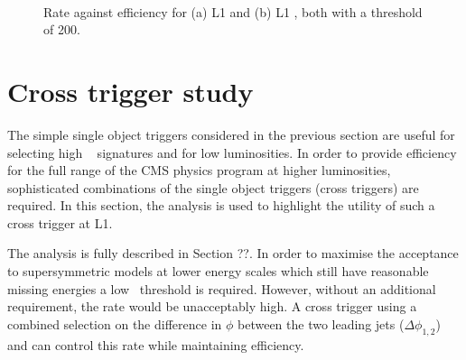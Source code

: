 \begin{figure}
\centering
	~
	\caption{Rate against efficiency for (a) L1 \scalht and (b) L1 \mht, both with a
	threshold of 200\GeV.}
	    \label{fig:rate_eff_sum}
\end{figure}

\section{Cross trigger study}

The simple single object triggers considered in the previous section are useful for selecting
high \pt~ signatures and for low luminosities. In order to provide efficiency for
the full range of the CMS physics program at higher luminosities, sophisticated combinations
of the single object triggers (cross triggers) are required. In this section, the \alphat 
analysis is used to highlight the utility of such a cross trigger at L1. 

The \alphat analysis is fully described in Section ??. In order to maximise the acceptance
to supersymmetric models at lower energy scales which still have reasonable missing energies
a low \scalht~threshold is required. However, without an additional requirement, the rate
would be unacceptably high. A cross trigger using a combined selection on the difference 
in $\phi$ between the two leading jets ($\Delta\phi_{1,2}$) and \scalht can control this rate while 
maintaining efficiency.

